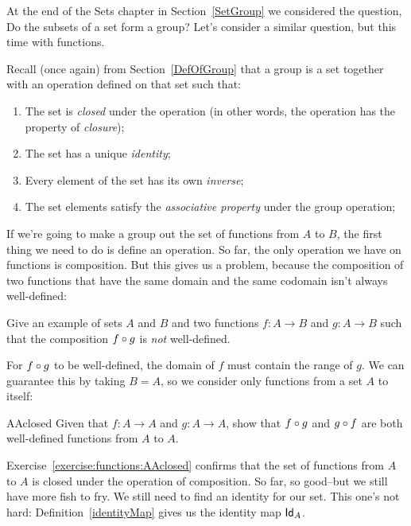 At the end of the Sets chapter in Section~\ref{SetGroup} we considered the question, Do the subsets of a set form a group? Let's consider a similar question, but this time with functions. 

Recall (once again) from Section~\ref{DefOfGroup} that a group is a set together with an operation defined on that set such that:  
\begin{enumerate}
\item
The set is \emph{closed} under the operation (in other words, the operation has the property of \emph{closure});
\item
The set has  a unique \emph{identity};
\item
Every element of the set has its own \emph{inverse};
\item
The set elements satisfy the \emph{associative property} under the group operation;
\end{enumerate}

If we're going to make a group out the set of functions from $A$ to $B$, the first thing we need to do is define an operation. So far, the only operation we have on functions is composition. But this gives us a problem, because the composition of two functions that have the same domain and the same codomain  isn't always well-defined: 

\begin{exercise}{}
Give an example of sets $A$ and $B$ and two functions $f: A \rightarrow B$ and $g: A \rightarrow B$ such that the composition $f \circ g$ is \emph{not} well-defined.
\end{exercise}

For $f \circ g$ to be well-defined,  the domain of $f$ must contain the range of $g$. We can guarantee this by taking $B=A$, so we consider only functions from a set $A$ to itself:

\begin{exercise}{AAclosed}
Given that $f: A \rightarrow A$ and $g: A \rightarrow A$, show that $f \circ g$ and $g \circ f$  are both  well-defined functions from $A$ to $A$.
\end{exercise}

Exercise~\ref{exercise:functions:AAclosed} confirms that  the set of functions from $A$ to $A$ is closed under the operation of composition.
So far, so good--but we still have more fish to fry. We still need to find an identity for our set.  This one's not hard: Definition~\ref{identityMap} gives us the identity map ${\sf Id}_A$. 

